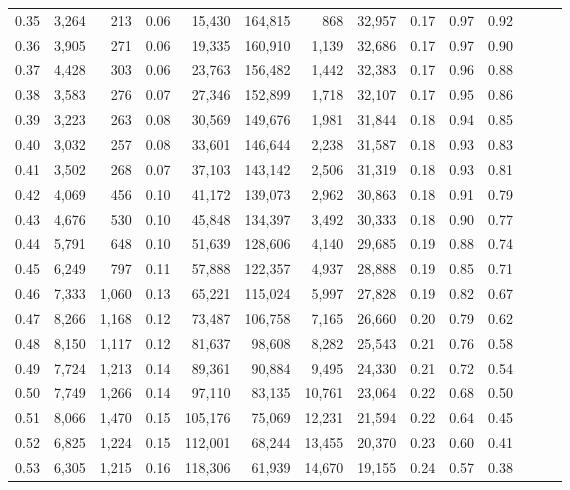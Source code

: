\begin{tabular}{rrrrrrrrrrrrrr}
0.35 &  3,264 &    213 &  0.06 &   15,430 &  164,815 &     868 &  32,957 &  0.17 &  0.97 &      0.92 \\
0.36 &  3,905 &    271 &  0.06 &   19,335 &  160,910 &   1,139 &  32,686 &  0.17 &  0.97 &      0.90 \\
0.37 &  4,428 &    303 &  0.06 &   23,763 &  156,482 &   1,442 &  32,383 &  0.17 &  0.96 &      0.88 \\
0.38 &  3,583 &    276 &  0.07 &   27,346 &  152,899 &   1,718 &  32,107 &  0.17 &  0.95 &      0.86 \\
0.39 &  3,223 &    263 &  0.08 &   30,569 &  149,676 &   1,981 &  31,844 &  0.18 &  0.94 &      0.85 \\
0.40 &  3,032 &    257 &  0.08 &   33,601 &  146,644 &   2,238 &  31,587 &  0.18 &  0.93 &      0.83 \\
0.41 &  3,502 &    268 &  0.07 &   37,103 &  143,142 &   2,506 &  31,319 &  0.18 &  0.93 &      0.81 \\
0.42 &  4,069 &    456 &  0.10 &   41,172 &  139,073 &   2,962 &  30,863 &  0.18 &  0.91 &      0.79 \\
0.43 &  4,676 &    530 &  0.10 &   45,848 &  134,397 &   3,492 &  30,333 &  0.18 &  0.90 &      0.77 \\
0.44 &  5,791 &    648 &  0.10 &   51,639 &  128,606 &   4,140 &  29,685 &  0.19 &  0.88 &      0.74 \\
0.45 &  6,249 &    797 &  0.11 &   57,888 &  122,357 &   4,937 &  28,888 &  0.19 &  0.85 &      0.71 \\
0.46 &  7,333 &  1,060 &  0.13 &   65,221 &  115,024 &   5,997 &  27,828 &  0.19 &  0.82 &      0.67 \\
0.47 &  8,266 &  1,168 &  0.12 &   73,487 &  106,758 &   7,165 &  26,660 &  0.20 &  0.79 &      0.62 \\
0.48 &  8,150 &  1,117 &  0.12 &   81,637 &   98,608 &   8,282 &  25,543 &  0.21 &  0.76 &      0.58 \\
0.49 &  7,724 &  1,213 &  0.14 &   89,361 &   90,884 &   9,495 &  24,330 &  0.21 &  0.72 &      0.54 \\
0.50 &  7,749 &  1,266 &  0.14 &   97,110 &   83,135 &  10,761 &  23,064 &  0.22 &  0.68 &      0.50 \\
0.51 &  8,066 &  1,470 &  0.15 &  105,176 &   75,069 &  12,231 &  21,594 &  0.22 &  0.64 &      0.45 \\
0.52 &  6,825 &  1,224 &  0.15 &  112,001 &   68,244 &  13,455 &  20,370 &  0.23 &  0.60 &      0.41 \\
0.53 &  6,305 &  1,215 &  0.16 &  118,306 &   61,939 &  14,670 &  19,155 &  0.24 &  0.57 &      0.38 \\

\end{tabular}
